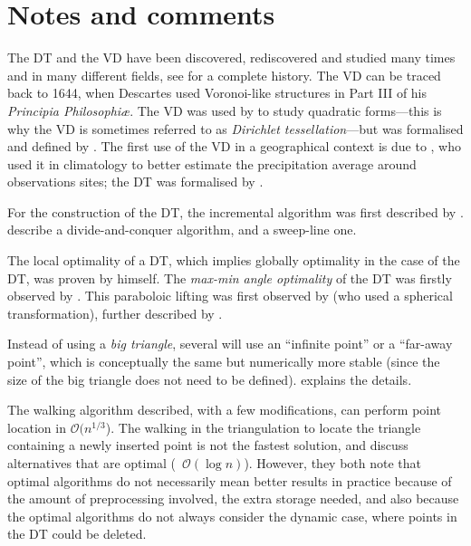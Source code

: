 %
\section{Notes and comments}%
\label{sec:notes}

The DT and the VD have been discovered, rediscovered and studied many times and in many different fields, see \citet{Okabe00} for a complete history.
The VD can be traced back to 1644, when Descartes used Voronoi-like structures in Part III of his \emph{Principia Philosophi\ae}. 
The VD was used by \citet{Dirichlet50} to study quadratic forms---this is why the VD is sometimes referred to as \emph{Dirichlet tessellation}---but was formalised and defined by \citet{Voronoi08}. 
The first use of the VD in a geographical context is due to \citet{Thiessen11}, who used it in climatology to better estimate the precipitation average around observations sites; the DT was formalised by \citet{Delaunay34}. 

For the construction of the DT, the incremental algorithm was first described by \citet{Lawson72-1}.
\citet{Guibas85} describe a divide-and-conquer algorithm, and \citet{Fortune87} a sweep-line one.

The local optimality of a DT, which implies globally optimality in the case of the DT, was proven by \citet{Delaunay34} himself.
The \emph{max-min angle optimality} of the DT was firstly observed by \citet{Sibson78}.
This paraboloic lifting was first observed by \citet{Brown79} (who used a spherical transformation), further described by \citet{Seidel82,Edelsbrunner86}. 

Instead of using a \emph{big triangle}, several will use an ``infinite point'' or a ``far-away point'', which is conceptually the same but numerically more stable (since the size of the big triangle does not need to be defined).
\citet{Liu05-1} explains the details.

The walking algorithm described, with a few modifications, can perform point location in $\mathcal{O}(n^{1/3}$).
The walking in the triangulation to locate the triangle containing a newly inserted point is not the fastest solution, \citet{Mucke99} and \citet{Devillers02} discuss alternatives that are optimal (\ie\ $\mathcal{O}(\log n)$).
However, they both note that optimal algorithms do not necessarily mean better results in practice because of the amount of preprocessing involved, the extra storage needed, and also because the optimal algorithms do not always consider the dynamic case, where points in the DT could be deleted. 


